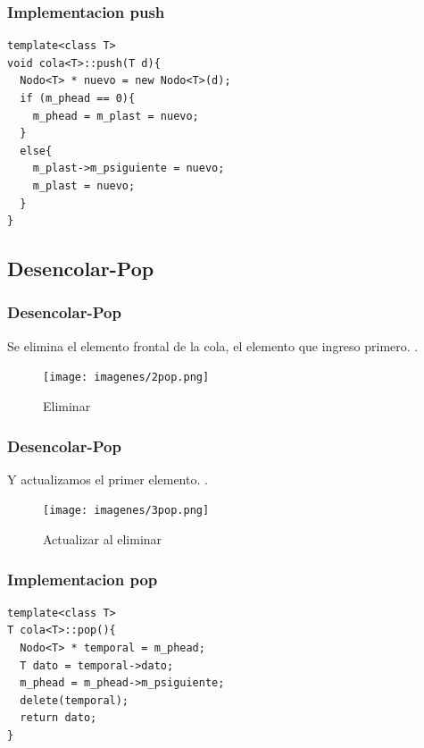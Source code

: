 \documentclass{beamer}
\begin{document}
\begin{frame}[fragile]
\frametitle{Implementacion push}
\begin{verbatim}
template<class T>
void cola<T>::push(T d){
  Nodo<T> * nuevo = new Nodo<T>(d);
  if (m_phead == 0){
    m_phead = m_plast = nuevo;
  }
  else{
    m_plast->m_psiguiente = nuevo;
    m_plast = nuevo;
  }
}
\end{verbatim}
\end{frame}



    
\subsection{Desencolar-Pop}
    \begin{frame}
      \frametitle{Desencolar-Pop}
      Se elimina el elemento frontal de la cola, el elemento que ingreso primero. 
      .\\
      
      \begin{figure}
	\texttt{[image: imagenes/2pop.png]}
      \caption{Eliminar}
      \end{figure}
      
    \end{frame}
    \begin{frame}
      \frametitle{Desencolar-Pop}
      Y actualizamos el primer elemento.
      .\\
      \begin{figure}
	\texttt{[image: imagenes/3pop.png]}
	\caption{Actualizar al eliminar}
      \end{figure}
    \end{frame}

\begin{frame}[fragile]
\frametitle{Implementacion pop}
\begin{verbatim}
template<class T>
T cola<T>::pop(){
  Nodo<T> * temporal = m_phead;
  T dato = temporal->dato;
  m_phead = m_phead->m_psiguiente;
  delete(temporal);
  return dato;
}
\end{verbatim}
\end{frame}


    
\end{document}

